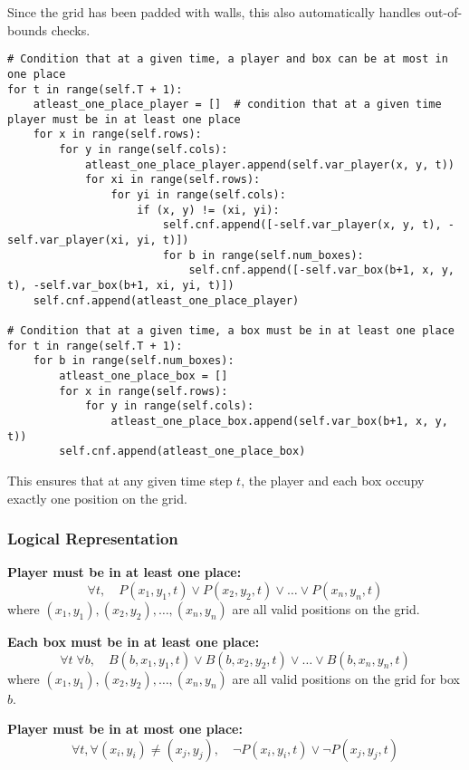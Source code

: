 \documentclass[12pt,a4paper]{article}
\begin{document}
Since the grid has been padded with walls, this also automatically handles out-of-bounds checks.
\newpage


\begin{lstlisting}
# Condition that at a given time, a player and box can be at most in one place
for t in range(self.T + 1):
    atleast_one_place_player = []  # condition that at a given time player must be in at least one place
    for x in range(self.rows):
        for y in range(self.cols):
            atleast_one_place_player.append(self.var_player(x, y, t))
            for xi in range(self.rows):
                for yi in range(self.cols):
                    if (x, y) != (xi, yi):
                        self.cnf.append([-self.var_player(x, y, t), -self.var_player(xi, yi, t)])
                        for b in range(self.num_boxes):
                            self.cnf.append([-self.var_box(b+1, x, y, t), -self.var_box(b+1, xi, yi, t)])
    self.cnf.append(atleast_one_place_player)

# Condition that at a given time, a box must be in at least one place
for t in range(self.T + 1):
    for b in range(self.num_boxes):
        atleast_one_place_box = []
        for x in range(self.rows):
            for y in range(self.cols):
                atleast_one_place_box.append(self.var_box(b+1, x, y, t))
        self.cnf.append(atleast_one_place_box)
\end{lstlisting}

This ensures that at any given time step \(t\), the player and each box occupy exactly one position on the grid.

\subsubsection*{Logical Representation}

\textbf{Player must be in at least one place:}
\[
\forall t, \quad P(x_1, y_1, t) \lor P(x_2, y_2, t) \lor \dots \lor P(x_n, y_n, t)
\]
where \((x_1, y_1), (x_2, y_2), \dots, (x_n, y_n)\) are all valid positions on the grid.

\textbf{Each box must be in at least one place:}
\[
\forall t \; \forall b, \quad B(b, x_1, y_1, t) \lor B(b, x_2, y_2, t) \lor \dots \lor B(b, x_n, y_n, t)
\]
where \((x_1, y_1), (x_2, y_2), \dots, (x_n, y_n)\) are all valid positions on the grid for box \(b\).

\textbf{Player must be in at most one place:}
\[
\forall t, \forall (x_i, y_i) \neq (x_j, y_j), \quad \neg P(x_i, y_i, t) \lor \neg P(x_j, y_j, t)
\]
\end{document}
